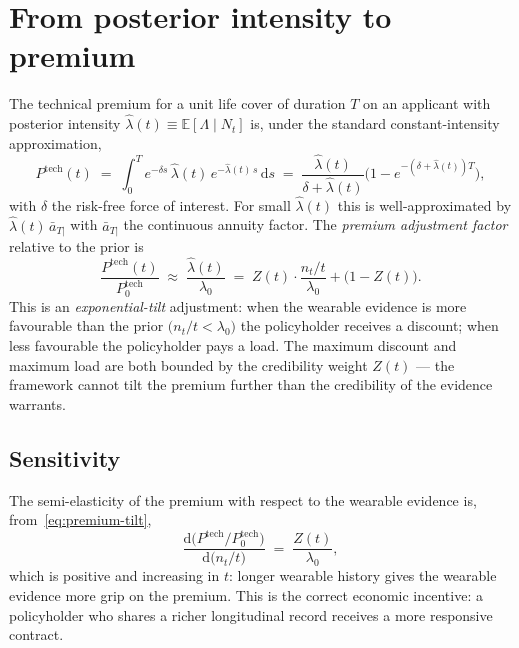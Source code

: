 \documentclass[11pt,a4paper]{article}
\let\origsection\section
\renewcommand{\section}{\clearpage\origsection}
\theoremstyle{ia}
\newcommand{\E}{\mathbb{E}}
\newcommand{\1}{\mathbf{1}}
\newcommand{\dd}{\mathrm{d}}
\begin{document}
\section{From posterior intensity to premium}\label{sec:premium}

The technical premium for a unit life cover of duration $T$ on an
applicant with posterior intensity
$\hat\lambda(t)\equiv\E[\Lambda\mid N_t]$ is, under the standard
constant-intensity approximation,
\begin{equation}\label{eq:premium-base}
   P^{\mathrm{tech}}(t) \;=\;
   \int_0^T e^{-\delta s}\,\hat\lambda(t)\,e^{-\hat\lambda(t)\,s}\,\dd s
   \;=\; \frac{\hat\lambda(t)}{\delta + \hat\lambda(t)}
        \bigl(1 - e^{-(\delta+\hat\lambda(t))T}\bigr),
\end{equation}
with $\delta$ the risk-free force of interest. For small
$\hat\lambda(t)$ this is well-approximated by
$\hat\lambda(t)\,\bar a_{T|}$ with $\bar a_{T|}$ the continuous
annuity factor. The \emph{premium adjustment factor} relative to the
prior is
\begin{equation}\label{eq:premium-tilt}
   \boxed{\;
   \frac{P^{\mathrm{tech}}(t)}{P^{\mathrm{tech}}_0}
   \;\approx\; \frac{\hat\lambda(t)}{\lambda_0}
   \;=\; Z(t)\cdot \frac{n_t/t}{\lambda_0} + \bigl(1-Z(t)\bigr).
   \;}
\end{equation}
This is an \emph{exponential-tilt} adjustment: when the wearable
evidence is more favourable than the prior $\bigl(n_t/t<\lambda_0\bigr)$
the policyholder receives a discount; when less favourable the
policyholder pays a load. The maximum discount and maximum load are
both bounded by the credibility weight $Z(t)$ --- the framework
cannot tilt the premium further than the credibility of the evidence
warrants.

\subsection{Sensitivity}\label{ss:sens}

The semi-elasticity of the premium with respect to the wearable
evidence is, from~\eqref{eq:premium-tilt},
\begin{equation}\label{eq:sens}
   \frac{\dd\bigl(P^{\mathrm{tech}}/P^{\mathrm{tech}}_0\bigr)}
        {\dd\bigl(n_t/t\bigr)}
   \;=\; \frac{Z(t)}{\lambda_0},
\end{equation}
which is positive and increasing in $t$: longer wearable history
gives the wearable evidence more grip on the premium. This is the
correct economic incentive: a policyholder who shares a richer
longitudinal record receives a more responsive contract.
\end{document}
